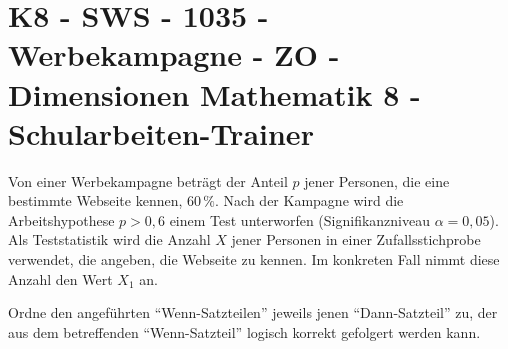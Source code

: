 \section{K8 - SWS - 1035 - Werbekampagne - ZO - Dimensionen Mathematik 8 - Schularbeiten-Trainer}

\begin{beispiel}[K8 - SWS]{1}
Von einer Werbekampagne beträgt der Anteil $p$ jener Personen, die eine bestimmte Webseite kennen, $60\,\%$. Nach der Kampagne wird die Arbeitshypothese $p>0,6$ einem Test unterworfen (Signifikanzniveau $\alpha=0,05$). Als Teststatistik wird die Anzahl $X$ jener Personen in einer Zufallsstichprobe verwendet, die angeben, die Webseite zu kennen. Im konkreten Fall nimmt diese Anzahl den Wert $X_1$ an.

Ordne den angeführten "`Wenn-Satzteilen"' jeweils jenen "`Dann-Satzteil"' zu, der aus dem betreffenden "`Wenn-Satzteil"' logisch korrekt gefolgert werden kann.

\end{beispiel}